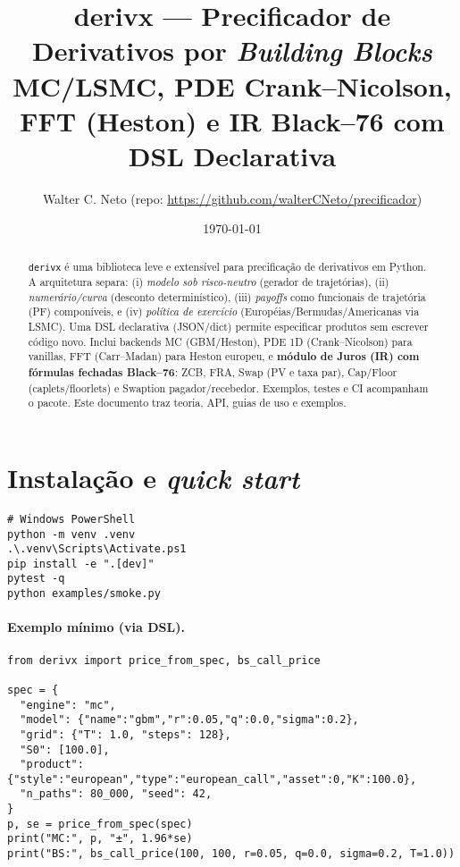 \documentclass[11pt,a4paper]{article}
\title{\textbf{derivx} --- Precificador de Derivativos por \emph{Building Blocks}\\
\large MC/LSMC, PDE Crank--Nicolson, FFT (Heston) e IR Black--76 com DSL Declarativa}
\author{Walter C. Neto (repo: \url{https://github.com/walterCNeto/precificador})}
\date{\today}
\begin{document}
\maketitle

\begin{abstract}
\texttt{derivx} é uma biblioteca leve e extensível para precificação de derivativos em Python.
A arquitetura separa: (i) \emph{modelo sob risco-neutro} (gerador de trajetórias),
(ii) \emph{numerário/curva} (desconto determinístico), (iii) \emph{payoffs} como funcionais de trajetória (PF) componíveis,
e (iv) \emph{política de exercício} (Européias/Bermudas/Americanas via LSMC).
Uma DSL declarativa (JSON/dict) permite especificar produtos sem escrever código novo.
Inclui backends MC (GBM/Heston), PDE 1D (Crank--Nicolson) para vanillas, FFT (Carr--Madan) para Heston europeu,
e \textbf{módulo de Juros (IR) com fórmulas fechadas Black--76}: ZCB, FRA, Swap (PV e taxa par), Cap/Floor (caplets/floorlets) e
Swaption pagador/recebedor. Exemplos, testes e CI acompanham o pacote. Este documento traz teoria, API, guias de uso e exemplos.
\end{abstract}

\tableofcontents

\section{Instalação e \emph{quick start}}
\begin{verbatim}
# Windows PowerShell
python -m venv .venv
.\.venv\Scripts\Activate.ps1
pip install -e ".[dev]"
pytest -q
python examples/smoke.py
\end{verbatim}

\paragraph{Exemplo mínimo (via DSL).}
\begin{lstlisting}[style=pystyle]
from derivx import price_from_spec, bs_call_price

spec = {
  "engine": "mc",
  "model": {"name":"gbm","r":0.05,"q":0.0,"sigma":0.2},
  "grid": {"T": 1.0, "steps": 128},
  "S0": [100.0],
  "product": {"style":"european","type":"european_call","asset":0,"K":100.0},
  "n_paths": 80_000, "seed": 42,
}
p, se = price_from_spec(spec)
print("MC:", p, "±", 1.96*se)
print("BS:", bs_call_price(100, 100, r=0.05, q=0.0, sigma=0.2, T=1.0))
\end{lstlisting}
\end{document}
